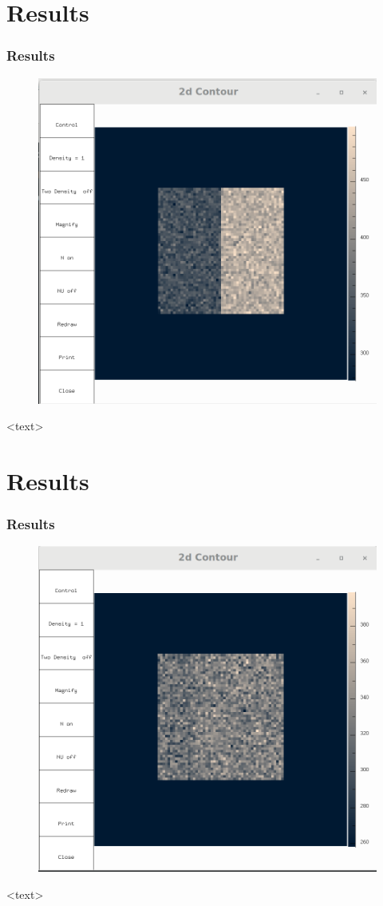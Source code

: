 \documentclass{beamer}
\begin{document}
\section{Results}
\begin{frame}
\frametitle{Results}
\begin{figure}
\includegraphics[scale=0.2]{A1p1}
\caption{}
\end{figure}
<text>
\end{frame}

\section{Results}
\begin{frame}
\frametitle{Results}
\begin{figure}
\includegraphics[scale=0.2]{A1p3}
\caption{}
\end{figure}
<text>
\end{frame}
\end{document}
